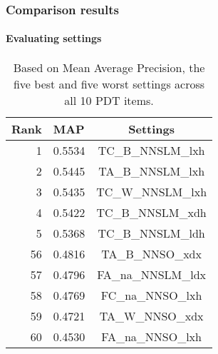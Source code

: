 \documentclass{beamer}
\begin{document}
\begin{frame}[noframenumbering]
\frametitle{Comparison results}
\framesubtitle{Evaluating settings}
\begin{table}%
\begin{center}
\begin{tabular}{|r|l|c|}
 \hline
 Rank & MAP & Settings \\
 \hline
 \hline
1 & 0.5534 & TC\_B\_NNSLM\_lxh \\
\hline
2 & 0.5445 & TA\_B\_NNSLM\_lxh \\
\hline
3 & 0.5435 & TC\_W\_NNSLM\_lxh \\
\hline
4 & 0.5422 & TC\_B\_NNSLM\_xdh \\
\hline
5 & 0.5368 & TC\_B\_NNSLM\_ldh \\
 \hline
 \hline
56 & 0.4816 & TA\_B\_NNSO\_xdx \\
\hline
57 & 0.4796 & FA\_na\_NNSLM\_ldx \\
\hline
58 & 0.4769 & FC\_na\_NNSO\_lxh \\
\hline
59 & 0.4721 & TA\_W\_NNSO\_xdx \\
\hline
60 & 0.4530 & FA\_na\_NNSO\_lxh \\
\hline
\end{tabular}
\vspace{.7em}
\caption{Based on Mean Average Precision, the five best and five worst settings across all 10 PDT items.}
\end{center}
\end{table}
\end{frame}
\end{document}
